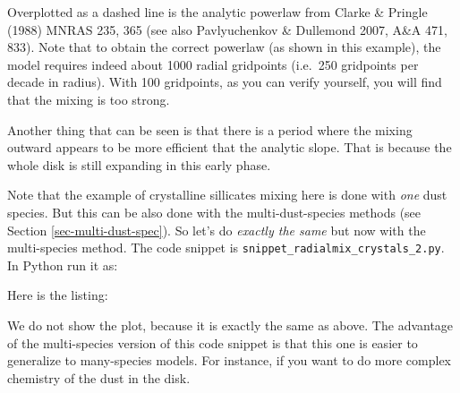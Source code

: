 \documentclass{book}
\newcommand{\code}[1]{{\small\tt #1}}
\begin{document}
Overplotted as a dashed line is the analytic powerlaw from Clarke \& Pringle (1988)
MNRAS 235, 365 (see also Pavlyuchenkov \& Dullemond 2007, A\&A 471, 833). Note that
to obtain the correct powerlaw (as shown in this example), the model requires indeed
about 1000 radial gridpoints (i.e.\ 250 gridpoints per decade in radius). With 100
gridpoints, as you can verify yourself, you will find that the mixing is too strong.

Another thing that can be seen is that there is a period where the mixing outward
appears to be more efficient that the analytic slope. That is because the whole disk
is still expanding in this early phase.

Note that the example of crystalline sillicates mixing here is done with {\em one}
dust species. But this can be also done with the multi-dust-species methods
(see Section \ref{sec-multi-dust-spec}). So let's do {\em exactly the same} but
now with the multi-species method. The code snippet is
\code{snippet\_radialmix\_crystals\_2.py}. In Python run it as:
\begin{codebox}
\end{codebox}
Here is the listing:

We do not show the plot, because it is exactly the same as above. The advantage of
the multi-species version of this code snippet is that this one is easier to
generalize to many-species models. For instance, if you want to do more complex
chemistry of the dust in the disk.
\end{document}
